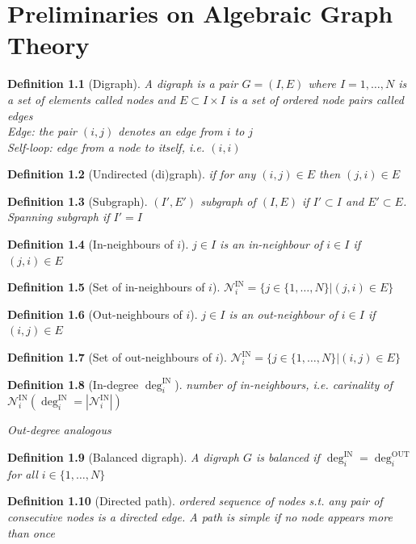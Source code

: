 \documentclass{book}
\theoremstyle{theoremv2}
\theoremstyle{defv2}
\newtheorem{definition}{Definition}[chapter]
\theoremstyle{remark}
\theoremstyle{remark}
\theoremstyle{definition}
\theoremstyle{definition}
\begin{document}
\chapter{Preliminaries on Algebraic Graph Theory}
\begin{definition}[Digraph]
    A digraph is a pair $G=(I,E)$ where $I={1,\dots,N}$ is a set of elements called \emph{nodes} and $E\subset I \times I$ is a set of ordered node pairs called \emph{edges}\\
    \emph{Edge}: the pair $(i,j)$ denotes an edge from $i$ to $j$\\ 
    \emph{Self-loop}: edge from a node to itself, i.e. $(i,i)$
\end{definition}
\begin{definition}[Undirected (di)graph]
    if for any $(i,j)\in E$ then $(j,i)\in E$  
\end{definition}
\begin{definition}[Subgraph]
    $(I',E')$ subgraph of $(I,E)$ if $I'\subset I$ and $E' \subset E$. Spanning subgraph if $I'=I$
\end{definition}
\begin{definition}[In-neighbours of $i$]$j\in I$ is an in-neighbour of $i\in I$ if $(j,i)\in E$
\end{definition}
\begin{definition}[Set of in-neighbours of $i$]
    $\mathcal{N}_i^{\text{IN}}=\{j\in\{1,\dots,N\}|(j,i)\in E\}$
\end{definition}
\begin{definition}[Out-neighbours of $i$]$j\in I$ is an out-neighbour of $i\in I$ if $(i,j)\in E$
\end{definition}
\begin{definition}[Set of out-neighbours of $i$]
    $\mathcal{N}_i^{\text{IN}}=\{j\in\{1,\dots,N\}|(i,j)\in E\}$
\end{definition}
\begin{definition}[In-degree $\deg_i^{\text{IN}}$]
    number of in-neighbours, i.e. carinality of $\mathcal{N}_i^{\text{IN}}(\deg_i^{\text{IN}}=|\mathcal{N}_i^{\text{IN}}|)$

    Out-degree analogous
\end{definition}
\begin{definition}[Balanced digraph]
    A digraph $G$ is balanced if $\deg_i^{\text{IN}}=\deg_i^{\text{OUT}}$ for all $i\in\{1,\dots,N\}$
\end{definition}
\begin{definition}[Directed path]
    ordered sequence of nodes s.t. any pair of consecutive nodes is a directed edge. A path is \emph{simple} if no node appears more than once
\end{definition}
\end{document}
